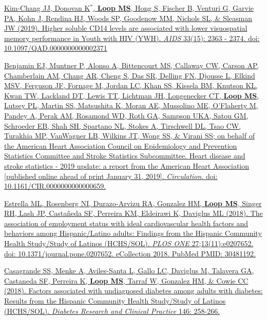 \documentclass[10pt,letterpaper]{article}
\begin{document}
\begin{etaremune}
\item \href{https://journals.lww.com/aidsonline/Fulltext/2019/12010/Higher_soluble_CD14_levels_are_associated_with.9.aspx}{Kim-Chang JJ, Donovan K$^*$, \textbf{Loop MS}, Hong S, Fischer B, Venturi G, Garvie PA, Kohn J, Rendina HJ, Woods SP, Goodenow MM, Nichols SL, \& Sleasman JW (2019). Higher soluble CD14 levels are associated with lower visuospatial memory performance in Youth with HIV (YWH). \emph{AIDS} 33(15): 2363 - 2374. doi: 10.1097/QAD.0000000000002371}



\item \href{https://www.ahajournals.org/doi/abs/10.1161/CIR.0000000000000659}{Benjamin EJ, Muntner P, Alonso A, Bittencourt MS, Callaway CW, Carson AP, Chamberlain AM, Chang AR, Cheng S, Das SR, Delling FN, Djousse L, Elkind MSV, Ferguson JF, Fornage M, Jordan LC, Khan SS, Kissela BM, Knutson KL, Kwan TW, Lackland DT, Lewis TT, Lichtman JH, Longenecker CT, \textbf{Loop MS}, Lutsey PL, Martin SS, Matsushita K, Moran AE, Mussolino ME, O’Flaherty M, Pandey A, Perak AM, Rosamond WD, Roth GA, Sampson UKA, Satou GM, Schroeder EB, Shah SH, Spartano NL, Stokes A, Tirschwell DL, Tsao CW, Turakhia MP, VanWagner LB, Wilkins JT, Wong SS, \& Virani SS; on behalf of the American Heart Association Council on Epidemiology and Prevention Statistics Committee and Stroke Statistics Subcommittee. Heart disease and stroke statistics - 2019 update: a report from the American Heart Association [published online ahead of print January 31, 2019]. \emph{Circulation}. doi: 10.1161/CIR.0000000000000659.}

\item \href{https://journals.plos.org/plosone/article?id=10.1371/journal.pone.0207652}{Estrella ML, Rosenberg NI, Durazo-Arvizu RA, Gonzalez HM, \textbf{Loop MS}, Singer RH, Lash JP, Castañeda SF, Perreira KM, Eldeirawi K, Daviglus ML (2018). The association of employment status with ideal cardiovascular health factors and behaviors among Hispanic/Latino adults: Findings from the Hispanic Community Health Study/Study of Latinos (HCHS/SOL). \emph{PLOS ONE} 27;13(11):e0207652. doi: 10.1371/journal.pone.0207652. eCollection 2018. PubMed PMID: 30481192.}

\item \href{https://www.sciencedirect.com/science/article/pii/S0168822718308866}{Casagrande SS, Menke A, Aviles-Santa L, Gallo LC, Daviglus M, Talavera GA, Castaneda SF, Perreira K, \textbf{Loop MS}, Tarraf W, Gonzalez HM, \& Cowie CC (2018). Factors associated with undiagnosed diabetes among adults with diabetes: Results from the Hispanic Community Health Study/Study of Latinos (HCHS/SOL). \emph{Diabetes Research and Clinical Practice} 146: 258-266.}


\end{etaremune}
\end{document}
